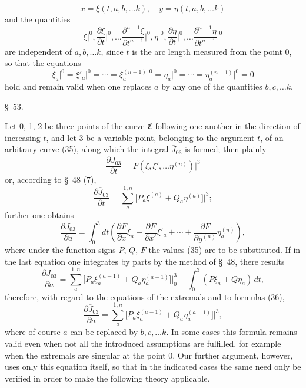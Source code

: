 \documentclass[11pt,a4paper,leqno]{article}
\begin{document}
\begin{equation}\tag{35}
x=\xi(t,a,b,\ldots k),\quad y=\eta(t,a,b,\ldots k)
\end{equation}
and the quantities
\[
\xi\bigg|^0,\frac{\partial\xi}{\partial t}\bigg|^0,\ldots \frac{\partial^{n-1}\xi}{\partial t^{n-1}}\bigg|^0,
\eta\bigg|^0,\frac{\partial\eta}{\partial t}\bigg|^0,\ldots \frac{\partial^{n-1}\eta}{\partial t^{n-1}}\bigg|^0
\]
are independent of $a,b,\ldots k$, since $t$ is the arc length measured from the point 0, so that the equations
\begin{equation}\tag{36}
\xi_a\bigg|^0=\xi'_a\bigg|^0=\cdots=\xi_a^{(n-1)}\bigg|^0=
\eta_a\bigg|^0=\cdots=\eta_a^{(n-1)}\bigg|^0=0
\end{equation}
hold and remain valid when one replaces $a$ by any one of the quantities $b,c,\ldots k$.


\begin{center}
{\large \S~53.}
\end{center}

Let 0, 1, 2 be three points of the curve $\mathfrak{C}$ following one another in the direction of increasing $t$, and let 3 be a variable point, belonging to the argument $t$, of an arbitrary curve (35), along which the integral $\overline{J}_{03}$ is formed; then plainly
\[
\frac{\partial\overline{J}_{03}}{\partial t}
=F(\xi,\xi',\ldots\eta^{(n)})\bigg|^3
\]
or, according to \S~48 (7),
\[
\frac{\partial\overline{J}_{03}}{\partial t}
=\sum_a^{1,n}\bigl[P_a\xi^{(a)}+Q_a\eta^{(a)}\bigr]\bigg|^3;
\]
further one obtains
\[
\frac{\partial\overline{J}_{03}}{\partial a}
=\int_0^3 dt\left(\frac{\partial F}{\partial x}\xi_a+
\frac{\partial F}{\partial x'}\xi'_a+\cdots+
\frac{\partial F}{\partial y^{(n)}}\eta_a^{(n)}\right),
\]
where under the function signs $P$, $Q$, $F$ the values (35) are to be substituted. If in the last equation one integrates by parts by the method of \S~48, there results
\[
\frac{\partial\overline{J}_{03}}{\partial a}
=\sum_a^{1,n}\bigl[P_a\xi_a^{(a-1)}+Q_a\eta_a^{(a-1)}\bigr]\bigg|_0^3
+\int_0^3(P\xi_a+Q\eta_a)\,dt,
\]
therefore, with regard to the equations of the extremals and to formulas (36),
\begin{equation}\tag{37}
\frac{\partial\overline{J}_{03}}{\partial a}
=\sum_a^{1,n}\bigl[P_a\xi_a^{(a-1)}+Q_a\eta_a^{(a-1)}\bigr]\bigg|^3,
\end{equation}
where of course $a$ can be replaced by $b,c,\ldots k$. In some cases this formula remains valid even when not all the introduced assumptions are fulfilled, for example when the extremals are singular at the point 0. Our further argument, however, uses only this equation itself, so that in the indicated cases the same need only be verified in order to make the following theory applicable.
\end{document}
